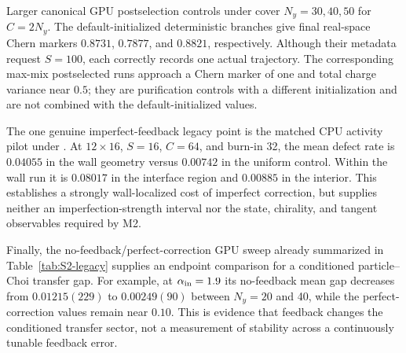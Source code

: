 \documentclass[aps,prx,twocolumn,floatfix,nofootinbib,superscriptaddress,longbibliography]{revtex4-2}
\begin{document}
Larger canonical GPU postselection controls under
 cover $N_y=30,40,50$ for $C=2N_y$.
The default-initialized deterministic branches give final real-space Chern markers
$0.8731$, $0.7877$, and $0.8821$, respectively.  Although their metadata request
$S=100$, each correctly records one actual trajectory.  The corresponding max-mix
postselected runs approach a Chern marker of one and total charge variance near $0.5$;
they are purification controls with a different initialization and are not combined with
the default-initialized values.

The one genuine imperfect-feedback legacy point is the matched CPU activity pilot under
.  At $12\times16$, $S=16$,
$C=64$, and burn-in 32, the mean defect rate is $0.04055$ in the wall geometry versus
$0.00742$ in the uniform control.  Within the wall run it is $0.08017$ in the interface
region and $0.00885$ in the interior.  This establishes a strongly wall-localized cost of
imperfect correction, but supplies neither an imperfection-strength interval nor the state,
chirality, and tangent observables required by M2.

Finally, the no-feedback/perfect-correction GPU sweep already summarized in
Table~\ref{tab:S2-legacy} supplies an endpoint comparison for a conditioned
particle--Choi transfer gap.  For example, at $\alpha_{\rm in}=1.9$ its no-feedback mean
gap decreases from $0.01215(229)$ to $0.00249(90)$ between $N_y=20$ and 40, while the
perfect-correction values remain near $0.10$.  This is evidence that feedback changes the
conditioned transfer sector, not a measurement of stability across a continuously tunable
feedback error.
\end{document}
